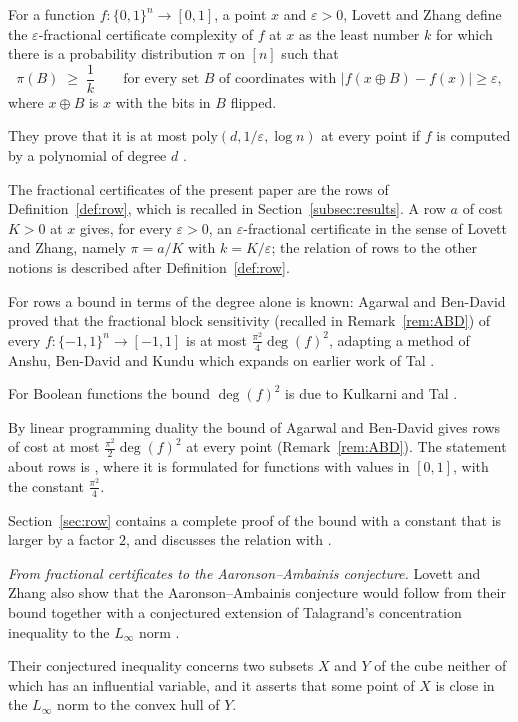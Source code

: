 \documentclass[11pt,reqno]{amsart}
\theoremstyle{definition}
\theoremstyle{remark}
\numberwithin{equation}{section}
\theoremstyle{named}
\theoremstyle{plain}
\newcommand{\eps}{\varepsilon}
\newcommand{\abs}[1]{\lvert #1\rvert}
\begin{document}
For a function $f\colon\{0,1\}^{n}\to[0,1]$, a point $x$ and
$\eps>0$, Lovett and Zhang \cite{LZ} define the $\eps$-fractional certificate complexity of $f$ at
$x$ as the least number $k$ for which there is a probability distribution $\pi$ on $[n]$ such that
\[
   \pi(B)\;\ge\;\frac1k\qquad\text{for every set $B$ of coordinates with }
   \abs{f(x\oplus B)-f(x)}\ge\eps,
\]
where
$x\oplus B$ is $x$ with the bits in $B$ flipped.

They prove that it is at most
$\mathrm{poly}(d,1/\eps,\log n)$ at every point if $f$ is computed by a polynomial of degree $d$
\cite[Theorem~2]{LZ}.

The fractional certificates of the present paper are the rows of Definition~\ref{def:row}, which
is recalled in Section~\ref{subsec:results}. A row $a$ of cost $K>0$ at $x$ gives, for every
$\eps>0$, an $\eps$-fractional certificate in the sense of Lovett and Zhang, namely $\pi=a/K$ with
$k=K/\eps$; the relation of rows to the other notions is described after Definition~\ref{def:row}.

For rows a bound in terms of the
degree alone is known: Agarwal and Ben-David \cite[Theorem~3.3]{ABD} proved that the fractional block
sensitivity (recalled in Remark~\ref{rem:ABD}) of every $f\colon\{-1,1\}^{n}\to[-1,1]$ is at most
$\frac{\pi^{2}}{4}\deg(f)^{2}$,
adapting a method of Anshu, Ben-David and Kundu \cite{ABK} which expands on earlier work of Tal
\cite{Tal}.

For Boolean functions the bound $\deg(f)^{2}$ is due to Kulkarni and Tal \cite{KT}.

By
linear programming duality the bound of Agarwal and Ben-David gives rows of cost at most
$\frac{\pi^{2}}{2}\deg(f)^{2}$ at every point (Remark~\ref{rem:ABD}). The statement about rows is \cite[Theorem~1.7]{ABD}, where it is
formulated for functions with values in $[0,1]$, with the constant $\frac{\pi^{2}}{4}$.

Section~\ref{sec:row} contains a complete proof of the bound with a
constant that is larger by a factor $2$, and discusses the relation with \cite{ABD}.

\medskip
\emph{From fractional certificates to the Aaronson--Ambainis conjecture.} Lovett and Zhang also show
that the Aaronson--Ambainis conjecture would follow from their bound together with a conjectured extension of Talagrand's concentration
inequality to the $L_\infty$ norm \cite[Section~5]{LZ}.

Their conjectured inequality \cite[Conjecture~37]{LZ} concerns two subsets
$X$ and $Y$ of the cube neither of which has an influential variable, and it asserts that some point of
$X$ is close in the $L_\infty$ norm to the convex hull of $Y$.
\end{document}
